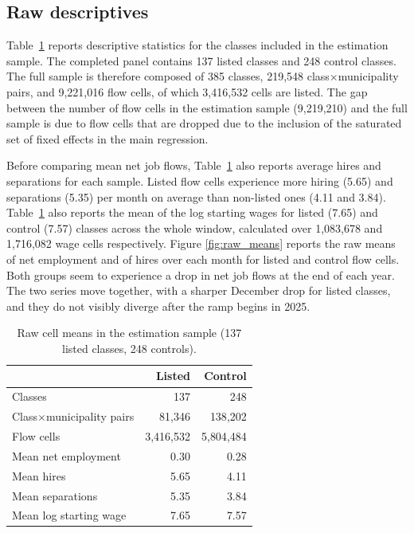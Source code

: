 \documentclass[12pt,a4paper]{article}
\begin{document}
\subsection{Raw descriptives}
\label{sec:desc}

Table~\ref{tab:desc} reports descriptive statistics for the classes included in the estimation sample. The completed panel contains 137 listed classes and 248 control classes. The full sample is therefore composed of 385 classes, 219,548 class$\times$municipality pairs, and 9,221,016 flow cells, of which 3,416,532 cells are listed. The gap between the number of flow cells in the estimation sample (9,219,210) and the full sample is due to flow cells that are dropped due to the inclusion of the saturated set of fixed effects in the main regression.

Before comparing mean net job flows, Table~\ref{tab:desc} also reports average hires and separations for each sample. Listed flow cells experience more hiring (5.65) and separations (5.35) per month on average than non-listed ones (4.11 and 3.84). Table~\ref{tab:desc} also reports the mean of the log starting wages for listed (7.65) and control (7.57) classes across the whole window, calculated over 1,083,678 and 1,716,082 wage cells respectively. Figure \ref{fig:raw_means} reports the raw means of net employment and of hires over each month for listed and control flow cells. Both groups seem to experience a drop in net job flows at the end of each year. The two series move together, with a sharper December drop for listed classes, and they do not visibly diverge after the ramp begins in 2025.

\begin{table}[H]
\centering
\caption{Raw cell means in the estimation sample (137 listed classes, 248 controls).}
\label{tab:desc}
\begin{tabular}{lrr}
\toprule
 & Listed & Control \\
\midrule
Classes & 137 & 248 \\
Class$\times$municipality pairs & 81{,}346 & 138{,}202 \\
Flow cells & 3{,}416{,}532 & 5{,}804{,}484 \\
Mean net employment & 0.30 & 0.28 \\
Mean hires & 5.65 & 4.11 \\
Mean separations & 5.35 & 3.84 \\
Mean log starting wage & 7.65 & 7.57 \\
\bottomrule
\end{tabular}
\end{table}
\end{document}
